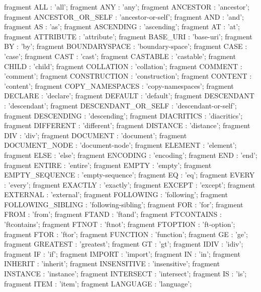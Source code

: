 fragment ALL           : 'all';
fragment ANY           : 'any';
fragment ANCESTOR         : 'ancestor';
fragment ANCESTOR_OR_SELF     : 'ancestor-or-self';
fragment AND           : 'and';
fragment AS           : 'as';
fragment ASCENDING         : 'ascending';
fragment AT           : 'at';
fragment ATTRIBUTE         : 'attribute';
fragment BASE_URI         : 'base-uri';
fragment BY           : 'by';
fragment BOUNDARYSPACE       : 'boundary-space';
fragment CASE           : 'case';
fragment CAST           : 'cast';
fragment CASTABLE         : 'castable';
fragment CHILD           : 'child';
fragment COLLATION         : 'collation';
fragment COMMENT         : 'comment';
fragment CONSTRUCTION       : 'construction';
fragment CONTENT         : 'content';
fragment COPY_NAMESPACES     : 'copy-namespaces';
fragment DECLARE         : 'declare';
fragment DEFAULT         : 'default';
fragment DESCENDANT       : 'descendant';
fragment DESCENDANT_OR_SELF   : 'descendant-or-self';
fragment DESCENDING       : 'descending';
fragment DIACRITICS       : 'diacritics';
fragment DIFFERENT         : 'different';
fragment DISTANCE         : 'distance';
fragment DIV           : 'div';
fragment DOCUMENT         : 'document';
fragment DOCUMENT_NODE       : 'document-node';
fragment ELEMENT         : 'element';
fragment ELSE           : 'else';
fragment ENCODING         : 'encoding';
fragment END           : 'end';
fragment ENTIRE         : 'entire';
fragment EMPTY           : 'empty';
fragment EMPTY_SEQUENCE     : 'empty-sequence';
fragment EQ           : 'eq';
fragment EVERY           : 'every';
fragment EXACTLY         : 'exactly';
fragment EXCEPT         : 'except';
fragment EXTERNAL         : 'external';
fragment FOLLOWING         : 'following';
fragment FOLLOWING_SIBLING     : 'following-sibling';
fragment FOR           : 'for';
fragment FROM           : 'from';
fragment FTAND           : 'ftand';
fragment FTCONTAINS       : 'ftcontains';
fragment FTNOT           : 'ftnot';
fragment FTOPTION         : 'ft-option';
fragment FTOR           : 'ftor';
fragment FUNCTION         : 'function';
fragment GE           : 'ge';
fragment GREATEST         : 'greatest';
fragment GT           : 'gt';
fragment IDIV           : 'idiv';
fragment IF           : 'if';
fragment IMPORT         : 'import';
fragment IN           : 'in';
fragment INHERIT         : 'inherit';
fragment INSENSITIVE       : 'insensitive';
fragment INSTANCE         : 'instance';
fragment INTERSECT         : 'intersect';
fragment IS           : 'is';
fragment ITEM           : 'item';
fragment LANGUAGE         : 'language';
